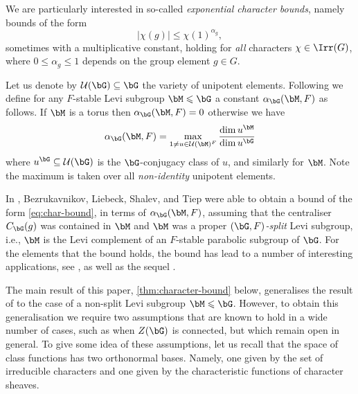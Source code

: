 \documentclass[eqthmnum,nocolour,skinny]{jt-calcs}
\begin{document}
\begin{pa}
We are particularly interested in so-called {\it exponential character bounds}, namely bounds of the form
\begin{equation}\label{eq:char-bound}
  |\chi(g)| \le \chi(1)^{\alpha_g},
\end{equation}
sometimes with a multiplicative constant, holding for {\it all} characters $\chi \in \Irr(G)$, where $0 \le \alpha_g \le 1$ depends on the group element $g \in G$.
\end{pa}

\begin{pa}
Let us denote by $\mathcal{U}(\bG) \subseteq \bG$ the variety of unipotent elements. Following \cite{bezrukavnikov-liebeck-shalev-tiep:2017:character-bounds-grps-Lie-type} we define for any $F$-stable Levi subgroup $\bM \leqslant \bG$ a constant $\alpha_{\bG}(\bM,F)$ as follows. If $\bM$ is a torus then $\alpha_{\bG}(\bM,F) = 0$ otherwise we have
\begin{equation*}
\alpha_{\bG}(\bM,F) = \max_{1\neq u \in \mathcal{U}(\bM)^F} \frac{\dim u^{\bM}}{\dim u^{\bG}}
\end{equation*}
where $u^{\bG} \subseteq \mathcal{U}(\bG)$ is the $\bG$-conjugacy class of $u$, and similarly for $\bM$. Note the maximum is taken over all \emph{non-identity} unipotent elements.
\end{pa}

\begin{pa}
In \cite[Thm.~1.1]{bezrukavnikov-liebeck-shalev-tiep:2017:character-bounds-grps-Lie-type}, Bezrukavnikov, Liebeck, Shalev, and Tiep were able to obtain a bound of the form \cref{eq:char-bound}, in terms of $\alpha_{\bG}(\bM,F)$, assuming that the centraliser $C_{\bG}(g)$ was contained in $\bM$ and $\bM$ was a proper {\it $(\bG,F)$-split} Levi subgroup, i.e., $\bM$ is the Levi complement of an $F$-stable parabolic subgroup of $\bG$. For the elements that the bound holds, the bound has lead to a number of interesting applications, see \cite[\S5]{bezrukavnikov-liebeck-shalev-tiep:2017:character-bounds-grps-Lie-type}, as well as the sequel \cite{LST}.
\end{pa}

\begin{pa}
The main result of this paper, \cref{thm:character-bound} below, generalises the result of \cite{bezrukavnikov-liebeck-shalev-tiep:2017:character-bounds-grps-Lie-type} to the case of a non-split Levi subgroup $\bM \leqslant \bG$. However, to obtain this generalisation we require two assumptions that are known to hold in a wide number of cases, such as when $Z(\bG)$ is connected, but which remain open in general. To give some idea of these assumptions, let us recall that the space of class functions has two orthonormal bases. Namely, one given by the set of irreducible characters and one given by the characteristic functions of character sheaves.
\end{pa}
\end{document}
